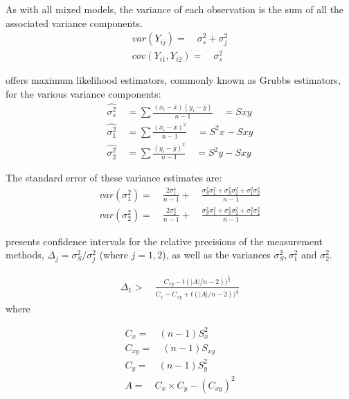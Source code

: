 \documentclass[12pt, a4paper]{article}
\begin{document}
	As with all mixed models, the variance of each observation is the
	sum of all the associated variance components.
	\begin{eqnarray}
		var(Y_{ij}) =\quad \sigma^{2}_{s} + \sigma^{2}_{j} \\
		cov(Y_{i1},Y_{i2})=\quad \sigma^{2}_{s} \nonumber
	\end{eqnarray}
	
	\citet{Grubbs48} offers maximum likelihood estimators, commonly
	known as Grubbs estimators, for the various variance components:
	\begin{eqnarray}
		\hat{\sigma^{2}_{s}} \quad= \sum{\frac{(x_{i}-\bar{x})(y_{i}-\bar{y})}{n-1}}\quad=Sxy\\
		\hat{\sigma^{2}_{1}} \quad= \sum{\frac{(x_{i}-\bar{x})^{2}}{n-1}} \quad=S^{2}x-Sxy \nonumber\\
		\hat{\sigma^{2}_{2}} \quad=
		\sum{\frac{(y_{i}-\bar{y})^{2}}{n-1}}\quad=S^{2}y-Sxy \nonumber
		\nonumber
	\end{eqnarray}
	
	The standard error of these variance estimates are:
	\begin{eqnarray}
		var(\sigma^{2}_{1}) =\quad \frac{2\sigma^{4}_{1}}{n-1} +\quad
		\frac{\sigma^2_{S}\sigma^2_{1}+\sigma^2_{S}\sigma^2_{2}+\sigma^2_{1}\sigma^2_{2}
		}{n-1}\\
		var(\sigma^{2}_{2}) =\quad \frac{2\sigma^{4}_{2}}{n-1} +\quad
		\frac{\sigma^2_{S}\sigma^2_{1}+\sigma^2_{S}\sigma^2_{2}+\sigma^2_{1}\sigma^2_{2}
		}{n-1}\nonumber
	\end{eqnarray}
	
	\citet{Thompson}presents confidence intervals for the relative
	precisions of the measurement methods, $\Delta_{j}=
	\sigma^2_{S}/\sigma^2_{j}$ (where $j=1,2$), as well as the
	variances $\sigma^{2}_{S}, \sigma^{2}_{1}$ and $\sigma^{2}_{2}$.
	
	\begin{eqnarray}
		\Delta_{1} >\quad \frac{C_{xy}-
			t(|A|/n-2))^{\frac{1}{2}}}{C_{x}-C_{xy}+
			t(|A|/n-2))^{\frac{1}{2}}}
	\end{eqnarray}
	where
	
	\begin{eqnarray}
		C_{x}=\quad(n-1)S^2_{x}\nonumber\\
		C_{xy}=\quad(n-1)S_{xy}\nonumber\\
		C_{y}=\quad(n-1)S^2_{y}\nonumber\\
		A=\quad C_{x}\times C_{y} - (C_{xy})^2 \nonumber
	\end{eqnarray}
	
\end{document}
